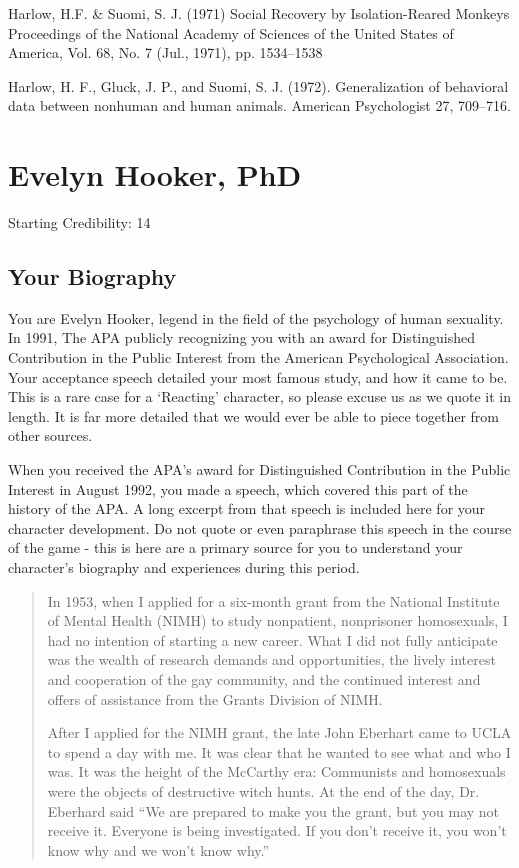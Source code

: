 \begin{refsection}
Harlow, H.F. \& Suomi, S. J. (1971) Social Recovery by Isolation-Reared Monkeys Proceedings of the National Academy of Sciences of the United States of America, Vol. 68, No. 7 (Jul., 1971), pp. 1534--1538

Harlow, H. F., Gluck, J. P., and Suomi, S. J. (1972). Generalization of behavioral data between nonhuman and human animals. American Psychologist 27, 709--716.

\chapter{Evelyn Hooker, PhD}
\label{evelynhookerphd}

Starting Credibility: 14

\section{Your Biography}
\label{yourbiography}

You are Evelyn Hooker, legend in the field of the psychology of human sexuality. In 1991, The APA publicly recognizing you with an award for Distinguished Contribution in the Public Interest from the American Psychological Association. Your acceptance speech detailed your most famous study, and how it came to be. This is a rare case for a `Reacting' character, so please excuse us as we quote it in length. It is far more detailed that we would ever be able to piece together from other sources.

When you received the APA’s award for Distinguished Contribution in the Public Interest in August 1992, you made a speech, which covered this part of the history of the APA. A long excerpt from that speech is included here for your character development. Do not quote or even paraphrase this speech in the course of the game - this is here are a primary source for you to understand your character’s biography and experiences during this period.

\begin{quote}

In 1953, when I applied for a six-month grant from the National Institute of Mental Health (NIMH) to study nonpatient, nonprisoner homosexuals, I had no intention of starting a new career. What I did not fully anticipate was the wealth of research demands and opportunities, the lively interest and cooperation of the gay community, and the continued interest and offers of assistance from the Grants Division of NIMH.

After I applied for the NIMH grant, the late John Eberhart came to UCLA to spend a day with me. It was clear that he wanted to see what and who I was. It was the height of the McCarthy era: Communists and homosexuals were the objects of destructive witch hunts. At the end of the day, Dr. Eberhard said ``We are prepared to make you the grant, but you may not receive it. Everyone is being investigated. If you don't receive it, you won't know why and we won't know why.''


\end{quote}
\end{refsection}

